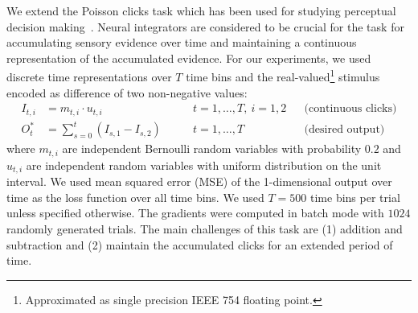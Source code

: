\documentclass{article} %
\newcounter{ct}
\theoremstyle{definition}
\theoremstyle{remark}
\renewcommand{\cite}{\citep}
\begin{document}
We extend the Poisson clicks task which has been used for studying perceptual decision making~\cite{brunton2013}.
Neural integrators are considered to be crucial for the task for accumulating sensory evidence over time and maintaining a continuous representation of the accumulated evidence.
For our experiments, we used discrete time representations over $T$ time bins and the real-valued\footnote{Approximated as single precision IEEE 754 floating point.} stimulus encoded as difference of two non-negative values:
\begin{align}
    I_{t,i} &= m_{t,i} \cdot u_{t,i} 
             \qquad & t=1,\dots, T, \ i=1,2 &&\text{(continuous clicks)}	\label{eq:input}
    \\
    O^\ast_{t} &= \sum_{s=0}^{t} \left(
        I_{s,1} - I_{s,2}
        \right)
            \qquad  & t=1,\dots, T &&  \text{(desired output)} 			\label{eq:output}
\end{align}
where $m_{t,i}$ are independent Bernoulli random variables with probability $0.2$ and $u_{t,i}$ are independent random variables with uniform distribution on the unit interval.
We used mean squared error (MSE) of the 1-dimensional output over time as the loss function over all time bins.
We used $T=500$ time bins per trial unless specified otherwise.
The gradients were computed in batch mode with $1024$ randomly generated trials.
The main challenges of this task are (1) addition and subtraction and (2) maintain the accumulated clicks for an extended period of time.


\end{document}
